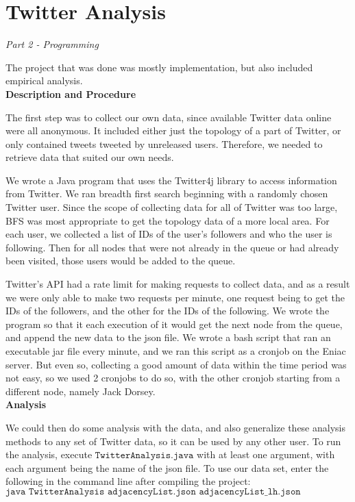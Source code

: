 \documentclass[letterpaper]{article}
\begin{document}
\pagestyle{fancy}
\section*{Twitter Analysis}
\textit{Part 2 - Programming}

The project that was done was mostly implementation, but also included empirical analysis.\\

\noindent\textbf{Description and Procedure}

The first step was to collect our own data, since available Twitter data online were all anonymous. It included either just the topology of a part of Twitter, or only contained tweets tweeted by unreleased users. Therefore, we needed to retrieve data that suited our own needs.

We wrote a Java program that uses the Twitter4j library to access information from Twitter. We ran breadth first search beginning with a randomly chosen Twitter user. Since the scope of collecting data for all of Twitter was too large, BFS was most appropriate to get the topology data of a more local area. For each user, we collected a list of IDs of the user's followers and who the user is following. Then for all nodes that were not already in the queue or had already been visited, those users would be added to the queue.

Twitter's API had a rate limit for making requests to collect data, and as a result we were only able to make two requests per minute, one request being to get the IDs of the followers, and the other for the IDs of the following. We wrote the program so that it each execution of it would get the next node from the queue, and append the new data to the json file. We wrote a bash script that ran an executable jar file every minute, and we ran this script as a cronjob on the Eniac server. But even so, collecting a good amount of data within the time period was not easy, so we used 2 cronjobs to do so, with the other cronjob starting from a different node, namely Jack Dorsey.\\

\noindent\textbf{Analysis}

We could then do some analysis with the data, and also generalize these analysis methods to any set of Twitter data, so it can be used by any other user. To run the analysis, execute $\texttt{TwitterAnalysis.java}$ with at least one argument, with each argument being the name of the json file. To use our data set, enter the following in the command line after compiling the project: $\texttt{java TwitterAnalysis adjacencyList.json adjacencyList\_lh.json}$\\
\end{document}
